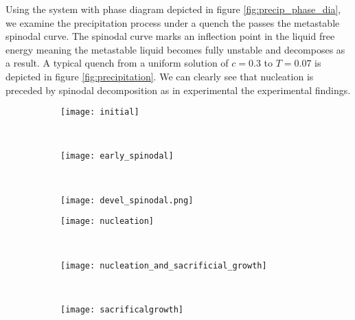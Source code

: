 
Using the system with phase diagram depicted in figure
\ref{fig:precip_phase_dia}, we examine the precipitation process under a quench
the passes the metastable spinodal curve. The spinodal curve marks an inflection
point in the liquid free energy meaning the metastable liquid becomes fully
unstable and decomposes as a result. A typical quench from a uniform solution
of $c = 0.3$ to $T = 0.07$ is depicted in figure \ref{fig:precipitation}. We
can clearly see that nucleation is preceded by spinodal decomposition as in
experimental the experimental findings. 
%
\begin{figure}
    \centering
    \begin{subfigure}[b]{0.3\textwidth}
        \texttt{[image: initial]}
        \label{fig:initial}
        \caption{}
    \end{subfigure}
    ~
    \begin{subfigure}[b]{0.3\textwidth}
        \texttt{[image: early\_spinodal]}
        \label{fig:early_spinodal}
        \caption{}
    \end{subfigure}
    ~
    \begin{subfigure}[b]{0.3\textwidth}
        \texttt{[image: devel\_spinodal.png]}
        \label{fig:devel_spinodal}
        \caption{}
    \end{subfigure}

    \vspace{0.25cm}
    \begin{subfigure}[b]{0.3\textwidth}
        \texttt{[image: nucleation]}
        \label{fig:nucleation}
        \caption{}
    \end{subfigure}
    ~
    \begin{subfigure}[b]{0.3\textwidth}
        \texttt{[image: nucleation\_and\_sacrificial\_growth]}
        \label{fig:nucleation_and_growth}
        \caption{} 
    \end{subfigure}
    ~
    \begin{subfigure}[b]{0.3\textwidth}
        \texttt{[image: sacrificalgrowth]}
        \label{fig:sacrifical_growth}
        \caption{}
    \end{subfigure}
    

\end{figure}
